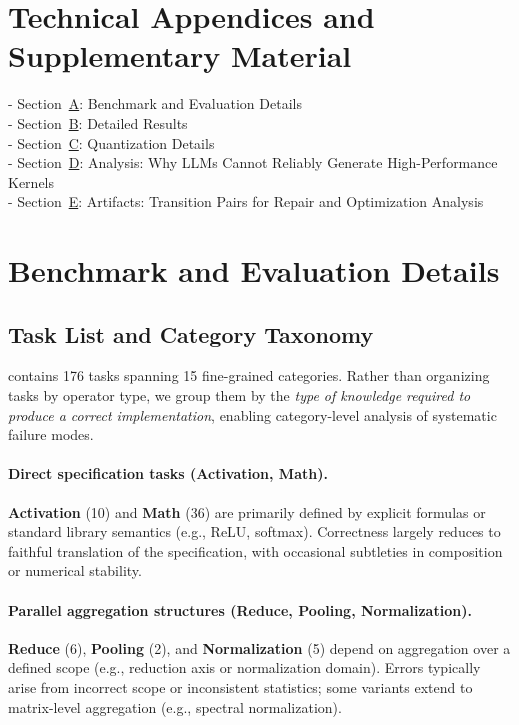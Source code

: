 \appendix

\section*{Technical Appendices and Supplementary Material}

\noindent
- Section~\hyperref[app:benchmark]{A}: Benchmark and Evaluation Details \\
- Section~\hyperref[app:detail_results]{B}: Detailed Results \\
- Section~\hyperref[app:quantization-details]{C}: Quantization Details \\
- Section~\hyperref[app:analysis]{D}: Analysis: Why LLMs Cannot Reliably Generate High-Performance Kernels \\
- Section~\hyperref[app:artifacts]{E}: Artifacts: Transition Pairs for Repair and Optimization Analysis


\section{Benchmark and Evaluation Details}
\label{app:benchmark}

\subsection{Task List and Category Taxonomy}

\oursys contains 176 tasks spanning 15 fine-grained categories. Rather than organizing tasks by operator type, we group them by the \emph{type of knowledge required to produce a correct implementation}, enabling category-level analysis of systematic failure modes.

\paragraph{Direct specification tasks (Activation, Math).}
\textbf{Activation} (10) and \textbf{Math} (36) are primarily defined by explicit formulas or standard library semantics (e.g.\@, ReLU, softmax). Correctness largely reduces to faithful translation of the specification, with occasional subtleties in composition or numerical stability.

\paragraph{Parallel aggregation structures (Reduce, Pooling, Normalization).}
\textbf{Reduce} (6), \textbf{Pooling} (2), and \textbf{Normalization} (5) depend on aggregation over a defined scope (e.g., reduction axis or normalization domain). 
Errors typically arise from incorrect scope or inconsistent statistics; some variants extend to matrix-level aggregation (e.g., spectral normalization).

